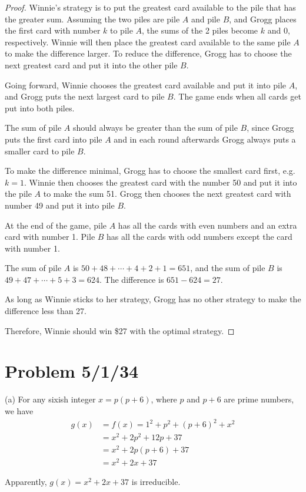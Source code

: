 \documentclass[11pt, oneside]{article}   	%
\begin{document}
\begin{proof}
Winnie's strategy is to put the greatest card available to the pile that has the greater sum. Assuming the two piles are pile $A$ and pile $B$, and  Grogg places the first card with number $k$ to pile $A$, the sums of the 2 piles become $k$ and $0$, respectively. Winnie will then place the greatest card available to the same pile $A$ to make the difference larger. To reduce the difference, Grogg has to choose the next greatest card and put it into the other pile $B$. 

Going forward, Winnie chooses the greatest card available and put it into pile $A$, and Grogg puts the next largest card to pile $B$. The game ends when all cards get put into both piles. 

The sum of pile $A$ should always be greater than the sum of pile $B$, since Grogg puts the first card into pile $A$ and in each round afterwards Grogg always puts a smaller card to pile $B$.

To make the difference minimal, Grogg has to choose the smallest card first, e.g. $k=1$. Winnie then chooses  the greatest card with the number 50 and put it into the pile $A$  to make the sum 51. Grogg then chooses the next greatest card with number 49 and put it into pile $B$.

At the end of the game, pile $A$ has all the cards with even numbers and an extra card with number 1. Pile $B$ has all the cards with odd numbers except the card with number 1.

The sum of pile $A$ is $50+48+\cdots +4+2+1=651$, and the sum of pile $B$ is $49+47+\cdots +5+3=624$. The difference is $651-624=27$.

As long as Winnie sticks to her strategy, Grogg has no other strategy to make the difference less than 27.

Therefore, Winnie should win \$27 with the optimal strategy.
\end{proof}

\newpage
\section{Problem 5/1/34}

(a) For any sixish integer $x=p(p+6)$, where $p$ and $p+6$ are prime numbers, we have 
\begin{align*}
g(x) & =f(x)=1^2+p^2+(p+6)^2+x^2\\
&=x^2+2p^2+12p+37\\
&=x^2+2p(p+6)+37\\
&=x^2+2x+37
\end{align*}

Apparently, $g(x) = x^2 + 2x + 37$ is irreducible. 
 
 
 
 
 
 
 
 
 
\end{document}
